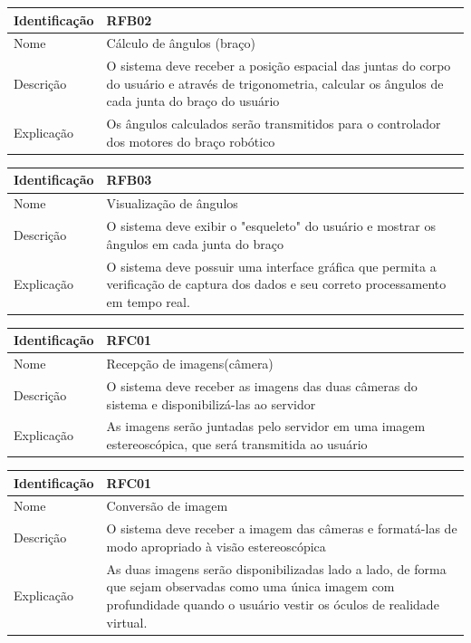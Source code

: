 	\begin{center}
	\begin{tabular}{ | l |  p{7cm} |}
		\hline
		Identificação & RFB02  \\ \hline
		Nome & Cálculo de ângulos (braço)\\ \hline
		Descrição & O sistema deve receber a posição espacial das juntas do corpo do usuário e através de trigonometria, calcular os ângulos de cada junta do braço do usuário
		\\ \hline
		Explicação & Os ângulos calculados serão transmitidos para o controlador dos motores do braço robótico  
		\\ \hline
		
	\end{tabular}
\end{center}
		\begin{center}
	\begin{tabular}{ | l |  p{7cm} |}
		\hline
		Identificação & RFB03  \\ \hline
		Nome & Visualização de ângulos\\ \hline
		Descrição & O sistema deve exibir o "esqueleto" do usuário e mostrar os ângulos em cada junta do braço
		\\ \hline
		Explicação & O sistema deve possuir uma interface gráfica que permita a verificação de captura dos dados e seu correto processamento em tempo real.
		\\ \hline
	\end{tabular}
\end{center}
	\begin{center}
	\begin{tabular}{ | l |  p{7cm} |}
		\hline
		Identificação & RFC01  \\ \hline
		Nome & Recepção de imagens(câmera)\\ \hline
		Descrição & O sistema deve receber as imagens das duas câmeras do sistema e disponibilizá-las ao servidor
		\\ \hline
		Explicação & As imagens serão juntadas pelo servidor em uma imagem estereoscópica, que será transmitida ao usuário
		\\ \hline
		
	\end{tabular}
\end{center}
		\begin{center}
		\begin{tabular}{ | l |  p{7cm} |}
			\hline
			Identificação & RFC01  \\ \hline
			Nome & Conversão de imagem\\ \hline
			Descrição & O sistema deve receber a imagem das câmeras e formatá-las de modo apropriado à visão estereoscópica
			\\ \hline
			Explicação & As duas imagens serão disponibilizadas lado a lado, de forma que sejam observadas como uma única imagem com profundidade quando o usuário vestir os óculos de realidade virtual.
			\\ \hline
		\end{tabular}
		\end{center}
